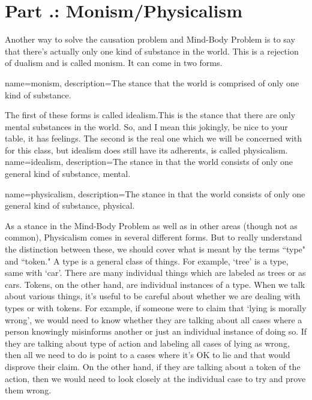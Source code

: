 \section{Part \thechapcount.\theseccount: Monism/Physicalism}

Another way to solve the causation problem and Mind-Body Problem is to say that there’s actually only one kind of substance in the world. This is a rejection of dualism and is called \gls{monism}. It can come in two forms.

{
name=monism,
description={The stance that the world is comprised of only one kind of substance.}
}


The first of these forms is called \Gls{idealism}.This is the stance that there are only mental substances in the world. So, and I mean this jokingly, be nice to your table, it has feelings. The second is the real one which we will be concerned with for this class, but idealism does still have its adherents, is called \Gls{physicalism}. 
{
name=idealism,
description={The stance in that the world consists of only one general kind of substance, mental.}
}

{
name=physicalism,
description={The stance in that the world consists of only one general kind of substance, physical.}
}


As a stance in the Mind-Body Problem as well as in other areas (though not as common), Physicalism comes in several different forms. But to really understand the distinction between these, we should cover what is meant by the terms ``type" and ``token." A type is a general class of things. For example, `tree' is a type, same with `car'. There are many individual things which are labeled as trees or as cars. Tokens, on the other hand, are individual instances of a type. When we talk about various things, it's useful to be careful about whether we are dealing with types or with tokens. For example, if someone were to claim that `lying is morally wrong', we would need to know whether they are talking about all cases where a person knowingly misinforms another or just an individual instance of doing so. If they are talking about type of action and labeling all cases of lying as wrong, then all we need to do is point to a cases where it's OK to lie and that would disprove their claim. On the other hand, if they are talking about a token of the action, then we would need to look closely at the individual case to try and prove them wrong.

